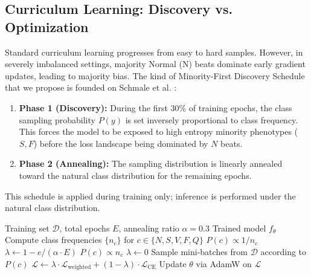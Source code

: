\documentclass[pdflatex,sn-mathphys-num]{sn-jnl}
\theoremstyle{thmstyleone}
\theoremstyle{thmstyletwo}
\theoremstyle{thmstylethree}
\begin{document}
\subsection{Curriculum Learning: Discovery vs. Optimization}
Standard curriculum learning progresses from easy to hard samples. However, in severely imbalanced settings, majority Normal (N) beats dominate early gradient updates, leading to majority bias. The kind of Minority-First Discovery Schedule that we propose is founded on Schmale et al. \cite{schmale_curriculum_2025}:

\begin{enumerate}
    \item \textbf{Phase 1 (Discovery):} During the first 30\% of training epochs, the class sampling probability $P(y)$ is set inversely proportional to class frequency. This forces the model to be exposed to high entropy minority phenotypes ($S, F$) before the loss landscape being dominated by $N$ beats.
    \item \textbf{Phase 2 (Annealing):} The sampling distribution is linearly annealed toward the natural class distribution for the remaining epochs.
\end{enumerate}

\noindent This schedule is applied during training only; inference is performed under the natural class distribution.

\begin{algorithm}[!t]
\caption{Minority-First Curriculum Learning Schedule}
\label{alg:curriculum}
\begin{algorithmic}[1]
\Require Training set $\mathcal{D}$, total epochs $E$, annealing ratio $\alpha = 0.3$
\Ensure Trained model $f_\theta$
\State Compute class frequencies $\{n_c\}$ for $c \in \{N, S, V, F, Q\}$
     
        \State $P(c) \propto 1 / n_c$ 
        \State $\lambda \gets 1 - e / (\alpha \cdot E)$ 
    \Else {}
        \State $P(c) \propto n_c$ 
        \State $\lambda \gets 0$
    \EndIf
    \State Sample mini-batches from $\mathcal{D}$ according to $P(c)$
    \State $\mathcal{L} \gets \lambda \cdot \mathcal{L}_{\text{weighted}} + (1-\lambda) \cdot \mathcal{L}_{\text{CE}}$
    \State Update $\theta$ via AdamW on $\mathcal{L}$
\EndFor
\end{algorithmic}
\end{algorithm}
\end{document}
